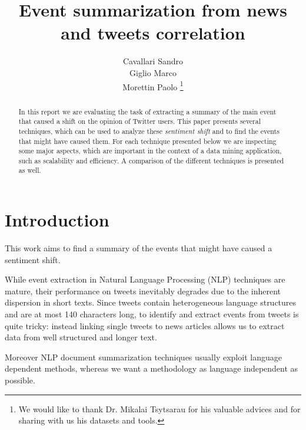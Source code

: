 \documentclass{acm_proc_article-sp-sigmod07}
\begin{document}
\title{Event summarization from news and tweets correlation}
\author{Cavallari Sandro\\Giglio Marco\\Morettin Paolo
\thanks{We would like to thank Dr. Mikalai Tsytsarau for his valuable advices and for sharing with us his datasets and tools.}}

%
\maketitle
\begin{abstract}
In this report we are evaluating the task of extracting a summary of the main event that caused a shift on the opinion of Twitter users. 
This paper presents several techniques, which can be used to analyze these \emph{sentiment shift} and to find the events that might have caused them.
For each technique presented below we are inspecting some major aspects, which are important in the context of a data mining application, such as scalability and efficiency.
 A comparison of the different techniques is presented as well.
 \end{abstract}   

\section{Introduction}
This work aims to find a summary of the events that might have caused a sentiment shift.

While event extraction in Natural Language Processing (NLP) techniques are mature, their performance on tweets inevitably degrades due to the inherent dispersion in short texts. Since tweets contain heterogeneous language structures and are at most 140 characters long, to identify and extract events from tweets is quite tricky: instead linking single tweets to news articles allows us to extract data from well structured and longer text.



Moreover NLP document summarization techniques usually exploit language dependent methods, whereas we want a methodology as language independent as possible.
\end{document}
